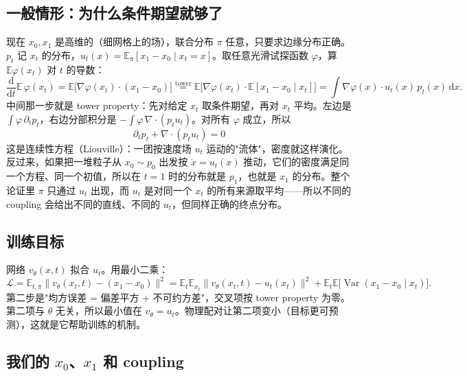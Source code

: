 \documentclass[11pt,UTF8,fontset=none]{ctexart}
\newcommand{\E}{\mathbb{E}}
\newcommand{\dd}{\mathrm{d}}
\newcommand{\Var}{\operatorname{Var}}
\begin{document}
\subsection{一般情形：为什么条件期望就够了}

现在 $x_0,x_1$ 是高维的（细网格上的场），联合分布 $\pi$ 任意，只要求边缘分布正确。$p_t$ 记 $x_t$ 的分布，$u_t(x)=\E_\pi[x_1-x_0\mid x_t=x]$。取任意光滑试探函数 $\varphi$，算 $\E\varphi(x_t)$ 对 $t$ 的导数：
\begin{equation}
\frac{\dd}{\dd t}\E\,\varphi(x_t)=\E\big[\nabla\varphi(x_t)\cdot(x_1-x_0)\big]
\overset{\text{tower}}{=}\E\Big[\nabla\varphi(x_t)\cdot\E[x_1-x_0\mid x_t]\Big]=\int\nabla\varphi(x)\cdot u_t(x)\,p_t(x)\,\dd x .
\end{equation}
中间那一步就是 tower property：先对给定 $x_t$ 取条件期望，再对 $x_t$ 平均。左边是 $\int\varphi\,\partial_tp_t$，右边分部积分是 $-\int\varphi\,\nabla\cdot(p_tu_t)$。对所有 $\varphi$ 成立，所以
\begin{equation}
\boxed{\;\partial_tp_t+\nabla\cdot(p_tu_t)=0\;}
\end{equation}
这是连续性方程（Liouville）：一团按速度场 $u_t$ 运动的"流体"，密度就这样演化。反过来，如果把一堆粒子从 $x_0\sim p_0$ 出发按 $\dot x=u_t(x)$ 推动，它们的密度满足同一个方程、同一个初值，所以在 $t=1$ 时的分布就是 $p_1$，也就是 $x_1$ 的分布。整个论证里 $\pi$ 只通过 $u_t$ 出现，而 $u_t$ 是对同一个 $x_t$ 的所有来源取平均——所以不同的 coupling 会给出不同的直线、不同的 $u_t$，但同样正确的终点分布。

\subsection{训练目标}

网络 $v_\theta(x,t)$ 拟合 $u_t$。用最小二乘：
\begin{equation}
\mathcal L=\E_{t,\pi}\big\|v_\theta(x_t,t)-(x_1-x_0)\big\|^2
=\E_t\E_{x_t}\big\|v_\theta(x_t,t)-u_t(x_t)\big\|^2+\E_t\E\big[\Var(x_1-x_0\mid x_t)\big].
\end{equation}
第二步是"均方误差 = 偏差平方 + 不可约方差"，交叉项按 tower property 为零。第二项与 $\theta$ 无关，所以最小值在 $v_\theta=u_t$。物理配对让第二项变小（目标更可预测），这就是它帮助训练的机制。

\subsection{我们的 $x_0$、$x_1$ 和 coupling}
\end{document}
